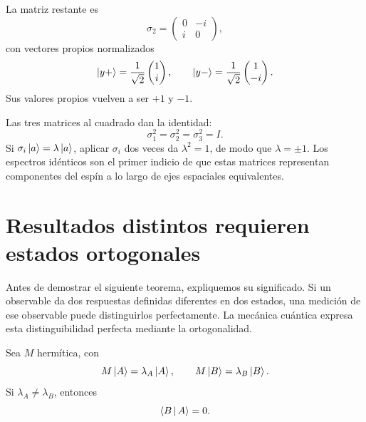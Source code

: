La matriz restante es
\begin{equation}
  \sigma_2=
  \begin{pmatrix}
    0&-i\\
    i&0
  \end{pmatrix},
\end{equation}
con vectores propios normalizados
\begin{equation}
  \left\lvert y+\right\rangle=\frac{1}{\sqrt2}\begin{pmatrix}1\\i\end{pmatrix},
  \qquad
  \left\lvert y-\right\rangle=\frac{1}{\sqrt2}\begin{pmatrix}1\\-i\end{pmatrix}.
  \label{eq:l03-sigma-two-eigenvectors}
\end{equation}
Sus valores propios vuelven a ser \(+1\) y \(-1\).

Las tres matrices al cuadrado dan la identidad:
\begin{equation}
  \sigma_1^2=\sigma_2^2=\sigma_3^2=I.
  \label{eq:l03-pauli-squares}
\end{equation}
Si \(\sigma_i\left\lvert a\right\rangle=\lambda\left\lvert a\right\rangle\), aplicar \(\sigma_i\) dos veces da \(\lambda^2=1\), de modo que \(\lambda=\pm1\). Los espectros idénticos son el primer indicio de que estas matrices representan componentes del espín a lo largo de ejes espaciales equivalentes.

\section{Resultados distintos requieren estados ortogonales}

Antes de demostrar el siguiente teorema, expliquemos su significado. Si un observable da dos respuestas definidas diferentes en dos estados, una medición de ese observable puede distinguirlos perfectamente. La mecánica cuántica expresa esta distinguibilidad perfecta mediante la ortogonalidad.

\begin{theorem}
Sea \(M\) hermítica, con
\begin{equation}
  M\left\lvert A\right\rangle=\lambda_A\left\lvert A\right\rangle,
  \qquad
  M\left\lvert B\right\rangle=\lambda_B\left\lvert B\right\rangle.
\end{equation}
Si \(\lambda_A\ne\lambda_B\), entonces
\begin{equation}
  \left\langle B\,\middle|\,A\right\rangle=0.
\end{equation}
\end{theorem}


